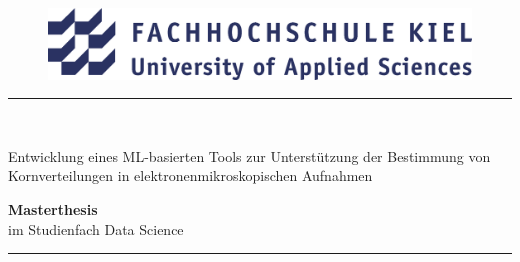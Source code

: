\begin{titlepage}
	\thispagestyle{empty}
\begin{figure}[H]	%
	\centering
	\includegraphics[width = 14cm]{../imgs/FH_Kiel_Logo.png} %
\end{figure}
	\begin{center}
		\newcommand{\HRule}{\rule{\linewidth}{0.5mm}}
		\HRule \\[0.4cm]
	\begin{spacing}{2.0}
	{\huge Entwicklung eines ML-basierten Tools zur Unterstützung der Bestimmung von Kornverteilungen in elektronenmikroskopischen Aufnahmen}
	\\\vspace*{0.5cm}
	\end{spacing}
	{\Large \textbf{Masterthesis}}\\
	{\Large im Studienfach \glqq{}Data Science\grqq{}}
	\HRule
	\\\vspace*{1.5cm}


\end{center}
\end{titlepage}

